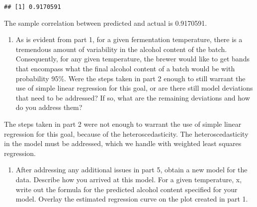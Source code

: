 \documentclass[
]{article}
\newenvironment{Shaded}{\begin{snugshade}}{\end{snugshade}}
\newcommand{\FunctionTok}[1]{\textcolor[rgb]{0.00,0.00,0.00}{#1}}
\newcommand{\NormalTok}[1]{#1}
\newcommand{\SpecialCharTok}[1]{\textcolor[rgb]{0.00,0.00,0.00}{#1}}
\providecommand{\tightlist}{%
  \setlength{\itemsep}{0pt}\setlength{\parskip}{0pt}}
\begin{document}
\begin{Shaded}
\end{Shaded}

\begin{verbatim}
## [1] 0.9170591
\end{verbatim}

The sample correlation between predicted and actual is 0.9170591.

\begin{enumerate}
\def\labelenumi{\arabic{enumi})}
\setcounter{enumi}{4}
\tightlist
\item
  As is evident from part 1, for a given fermentation temperature, there
  is a tremendous amount of variability in the alcohol content of the
  batch. Consequently, for any given temperature, the brewer would like
  to get bands that encompass what the final alcohol content of a batch
  would be with probability 95\%. Were the steps taken in part 2 enough
  to still warrant the use of simple linear regression for this goal, or
  are there still model deviations that need to be addressed? If so,
  what are the remaining deviations and how do you address them?
\end{enumerate}

The steps taken in part 2 were not enough to warrant the use of simple
linear regression for this goal, because of the heteroscedasticity. The
heteroscedasticity in the model must be addressed, which we handle with
weighted least squares regression.

\begin{enumerate}
\def\labelenumi{\arabic{enumi})}
\setcounter{enumi}{5}
\tightlist
\item
  After addressing any additional issues in part 5, obtain a new model
  for the data. Describe how you arrived at this model. For a given
  temperature, x, write out the formula for the predicted alcohol
  content specified for your model. Overlay the estimated regression
  curve on the plot created in part 1.
\end{enumerate}
\end{document}
